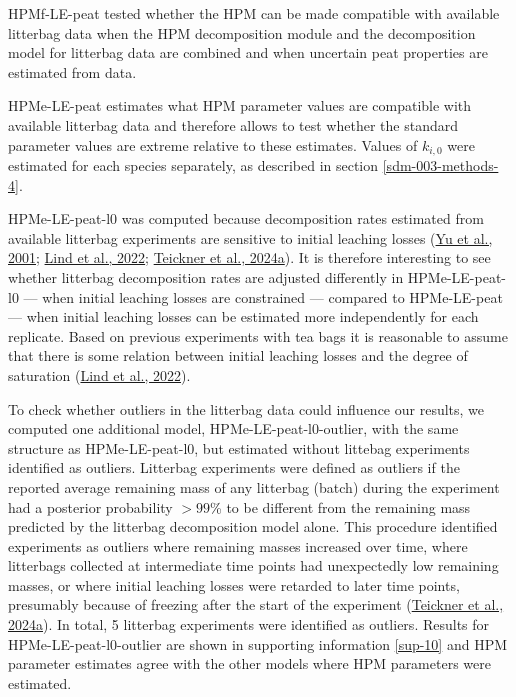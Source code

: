 \documentclass[
  12pt,
]{article}
\begin{document}
HPMf-LE-peat tested whether the HPM can be made compatible with available litterbag data when the HPM decomposition module and the decomposition model for litterbag data are combined and when uncertain peat properties are estimated from data.

HPMe-LE-peat estimates what HPM parameter values are compatible with available litterbag data and therefore allows to test whether the standard parameter values are extreme relative to these estimates. Values of \(k_{i,0}\) were estimated for each species separately, as described in section \ref{sdm-003-methods-4}.

HPMe-LE-peat-l0 was computed because decomposition rates estimated from available litterbag experiments are sensitive to initial leaching losses (\protect\hyperlink{ref-Yu.2001}{Yu et al., 2001}; \protect\hyperlink{ref-Lind.2022}{Lind et al., 2022}; \protect\hyperlink{ref-Teickner.2024}{Teickner et al., 2024a}). It is therefore interesting to see whether litterbag decomposition rates are adjusted differently in HPMe-LE-peat-l0 --- when initial leaching losses are constrained --- compared to HPMe-LE-peat --- when initial leaching losses can be estimated more independently for each replicate. Based on previous experiments with tea bags it is reasonable to assume that there is some relation between initial leaching losses and the degree of saturation (\protect\hyperlink{ref-Lind.2022}{Lind et al., 2022}).

To check whether outliers in the litterbag data could influence our results, we computed one additional model, HPMe-LE-peat-l0-outlier, with the same structure as HPMe-LE-peat-l0, but estimated without littebag experiments identified as outliers. Litterbag experiments were defined as outliers if the reported average remaining mass of any litterbag (batch) during the experiment had a posterior probability \(>99\)\% to be different from the remaining mass predicted by the litterbag decomposition model alone. This procedure identified experiments as outliers where remaining masses increased over time, where litterbags collected at intermediate time points had unexpectedly low remaining masses, or where initial leaching losses were retarded to later time points, presumably because of freezing after the start of the experiment (\protect\hyperlink{ref-Teickner.2024}{Teickner et al., 2024a}). In total, 5 litterbag experiments were identified as outliers. Results for HPMe-LE-peat-l0-outlier are shown in supporting information \ref{sup-10} and HPM parameter estimates agree with the other models where HPM parameters were estimated.
\end{document}
